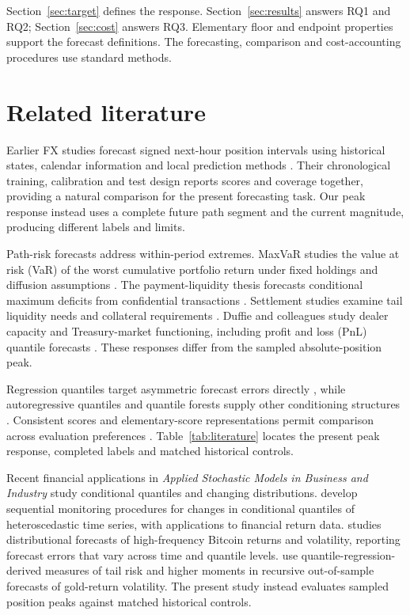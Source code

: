 \documentclass[11pt,a4paper]{article}
\begin{document}
Section~\ref{sec:target} defines the response. Section~\ref{sec:results} answers RQ1 and RQ2; Section~\ref{sec:cost} answers RQ3. Elementary floor and endpoint properties support the forecast definitions. The forecasting, comparison and cost-accounting procedures use standard methods.

\FloatBarrier

\section{Related literature}\label{sec:literature}

Earlier FX studies forecast signed next-hour position intervals using historical states, calendar information and local prediction methods \citep{wisniewski2020,wisniewski2024}. Their chronological training, calibration and test design reports scores and coverage together, providing a natural comparison for the present forecasting task. Our peak response instead uses a complete future path segment and the current magnitude, producing different labels and limits.


Path-risk forecasts address within-period extremes. MaxVaR studies the value at risk (VaR) of the worst cumulative portfolio return under fixed holdings and diffusion assumptions \citep{boudoukh2004}. The payment-liquidity thesis forecasts conditional maximum deficits from confidential transactions \citep{hoogen2017}. Settlement studies examine tail liquidity needs and collateral requirements \citep{petrunia2019,arjani2020}. Duffie and colleagues study dealer capacity and Treasury-market functioning, including profit and loss (PnL) quantile forecasts \citep{duffie2023}. These responses differ from the sampled absolute-position peak.


Regression quantiles target asymmetric forecast errors directly \citep{koenker1978}, while autoregressive quantiles and quantile forests supply other conditioning structures \citep{engle2004,meinshausen2006}. Consistent scores and elementary-score representations permit comparison across evaluation preferences \citep{gneiting2011,ehm2016}. Table~\ref{tab:literature} locates the present peak response, completed labels and matched historical controls.


Recent financial applications in \emph{Applied Stochastic Models in Business and Industry} study conditional quantiles and changing distributions. \citet{LeeKim2024ASMBI} develop sequential monitoring procedures for changes in conditional quantiles of heteroscedastic time series, with applications to financial return data. \citet{Pagnottoni2026ASMBI} studies distributional forecasts of high-frequency Bitcoin returns and volatility, reporting forecast errors that vary across time and quantile levels. \citet{MuddanaEtAl2025ASMBI} use quantile-regression-derived measures of tail risk and higher moments in recursive out-of-sample forecasts of gold-return volatility. The present study instead evaluates sampled position peaks against matched historical controls.
\end{document}
